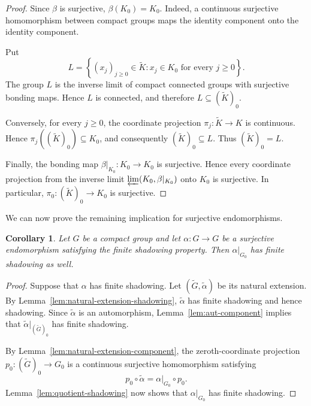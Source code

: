 \documentclass[12pt]{amsart}
\newtheorem{corollary}[theorem]{Corollary}
\theoremstyle{definition}
\numberwithin{equation}{section}
\theoremstyle{remark}
\begin{document}
\begin{proof}
Since $\beta$ is surjective, $\beta(K_0)=K_0$. Indeed, a continuous
surjective homomorphism between compact groups maps the identity
component onto the identity component.

Put
\begin{equation*}
L
=
\left\{
(x_j)_{j\geq 0}\in\widetilde K:
x_j\in K_0 \text{ for every } j\geq 0
\right\}.
\end{equation*}
The group $L$ is the inverse limit of compact connected groups with
surjective bonding maps. Hence $L$ is connected, and therefore
$L\subseteq(\widetilde K)_0$.

Conversely, for every $j\geq 0$, the coordinate projection
$\pi_j:\widetilde K\to K$ is continuous. Hence
$\pi_j((\widetilde K)_0)\subseteq K_0$, and consequently
$(\widetilde K)_0\subseteq L$. Thus $(\widetilde K)_0=L$.

Finally, the bonding map
$\beta|_{K_0}:K_0\to K_0$ is surjective. Hence every coordinate
projection from the inverse limit $\varprojlim(K_0,\beta|_{K_0})$
onto $K_0$ is surjective. In particular,
$\pi_0:(\widetilde K)_0\to K_0$ is surjective.
\end{proof}




We can now prove the remaining implication for surjective
endomorphisms.

\begin{corollary}\label{surshad}
Let $G$ be a compact group and let $\alpha:G\to G$ be a surjective
endomorphism satisfying the finite shadowing property. Then $\alpha|_{G_0}$ has finite shadowing as well.
\end{corollary}

\begin{proof}
Suppose that $\alpha$ has finite shadowing. Let
$
(\widetilde G,\widetilde\alpha)
$
be its natural extension. By Lemma~\ref{lem:natural-extension-shadowing},
$\widetilde\alpha$ has finite shadowing and hence shadowing. Since $\widetilde\alpha$ is an
automorphism, Lemma~\ref{lem:aut-component} implies that
$
\widetilde\alpha|_{(\widetilde G)_0}
$
has finite shadowing.

By Lemma~\ref{lem:natural-extension-component}, the zeroth-coordinate
projection
$
p_0:(\widetilde G)_0\to G_0
$
is a continuous surjective homomorphism satisfying
\[
p_0\circ\widetilde\alpha
=
\alpha|_{G_0}\circ p_0.
\]
Lemma~\ref{lem:quotient-shadowing} now shows that
$\alpha|_{G_0}$ has finite shadowing.
\end{proof}
\end{document}
